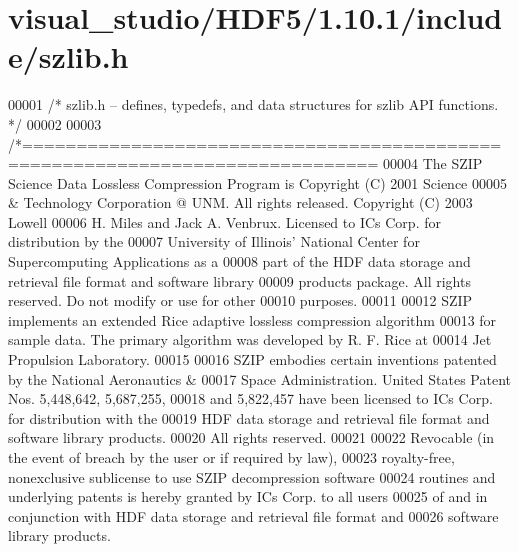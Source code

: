\hypertarget{visual__studio_2_h_d_f5_21_810_81_2include_2szlib_8h_source}{}\section{visual\+\_\+studio/\+H\+D\+F5/1.10.1/include/szlib.h}
\label{visual__studio_2_h_d_f5_21_810_81_2include_2szlib_8h_source}

\begin{DoxyCode}
00001 \textcolor{comment}{/* szlib.h -- defines, typedefs, and data structures for szlib API functions. */}
00002 
00003 \textcolor{comment}{/*==============================================================================}
00004 \textcolor{comment}{The SZIP Science Data Lossless Compression Program is Copyright (C) 2001 Science}
00005 \textcolor{comment}{& Technology Corporation @ UNM.  All rights released.  Copyright (C) 2003 Lowell}
00006 \textcolor{comment}{H. Miles and Jack A. Venbrux.  Licensed to ICs Corp. for distribution by the}
00007 \textcolor{comment}{University of Illinois' National Center for Supercomputing Applications as a}
00008 \textcolor{comment}{part of the HDF data storage and retrieval file format and software library}
00009 \textcolor{comment}{products package.  All rights reserved.  Do not modify or use for other}
00010 \textcolor{comment}{purposes.}
00011 \textcolor{comment}{}
00012 \textcolor{comment}{SZIP implements an extended Rice adaptive lossless compression algorithm}
00013 \textcolor{comment}{for sample data.  The primary algorithm was developed by R. F. Rice at}
00014 \textcolor{comment}{Jet Propulsion Laboratory.}
00015 \textcolor{comment}{}
00016 \textcolor{comment}{SZIP embodies certain inventions patented by the National Aeronautics &}
00017 \textcolor{comment}{Space Administration.  United States Patent Nos. 5,448,642, 5,687,255,}
00018 \textcolor{comment}{and 5,822,457 have been licensed to ICs Corp. for distribution with the}
00019 \textcolor{comment}{HDF data storage and retrieval file format and software library products.}
00020 \textcolor{comment}{All rights reserved.}
00021 \textcolor{comment}{}
00022 \textcolor{comment}{Revocable (in the event of breach by the user or if required by law),}
00023 \textcolor{comment}{royalty-free, nonexclusive sublicense to use SZIP decompression software}
00024 \textcolor{comment}{routines and underlying patents is hereby granted by ICs Corp. to all users}
00025 \textcolor{comment}{of and in conjunction with HDF data storage and retrieval file format and}
00026 \textcolor{comment}{software library products.}

\end{DoxyCode}
